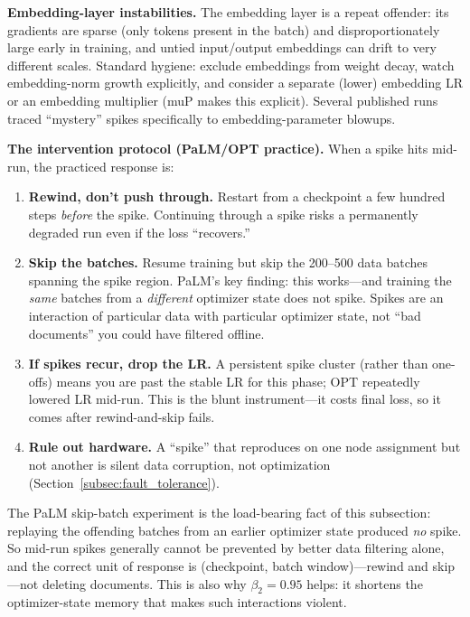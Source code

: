 \textbf{Embedding-layer instabilities.} The embedding layer is a repeat offender: its gradients are sparse (only tokens present in the batch) and disproportionately large early in training, and untied input/output embeddings can drift to very different scales. Standard hygiene: exclude embeddings from weight decay, watch embedding-norm growth explicitly, and consider a separate (lower) embedding LR or an embedding multiplier (muP makes this explicit). Several published runs traced ``mystery'' spikes specifically to embedding-parameter blowups.

\textbf{The intervention protocol (PaLM/OPT practice).} When a spike hits mid-run, the practiced response is:
\begin{enumerate}
    \item \textbf{Rewind, don't push through.} Restart from a checkpoint a few hundred steps \emph{before} the spike. Continuing through a spike risks a permanently degraded run even if the loss ``recovers.''
    \item \textbf{Skip the batches.} Resume training but skip the 200--500 data batches spanning the spike region. PaLM's key finding: this works---and training the \emph{same} batches from a \emph{different} optimizer state does not spike. Spikes are an interaction of particular data with particular optimizer state, not ``bad documents'' you could have filtered offline.
    \item \textbf{If spikes recur, drop the LR.} A persistent spike cluster (rather than one-offs) means you are past the stable LR for this phase; OPT repeatedly lowered LR mid-run. This is the blunt instrument---it costs final loss, so it comes after rewind-and-skip fails.
    \item \textbf{Rule out hardware.} A ``spike'' that reproduces on one node assignment but not another is silent data corruption, not optimization (Section~\ref{subsec:fault_tolerance}).
\end{enumerate}

\begin{keyinsight}
The PaLM skip-batch experiment is the load-bearing fact of this subsection: replaying the offending batches from an earlier optimizer state produced \emph{no} spike. So mid-run spikes generally cannot be prevented by better data filtering alone, and the correct unit of response is (checkpoint, batch window)---rewind and skip---not deleting documents. This is also why $\beta_2 = 0.95$ helps: it shortens the optimizer-state memory that makes such interactions violent.
\end{keyinsight}

